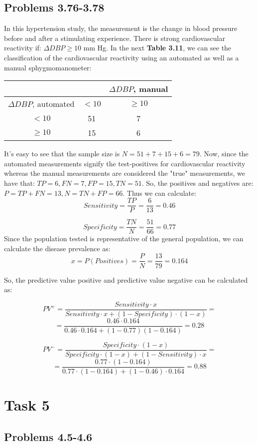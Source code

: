 \documentclass[12pt,a4paper]{article}
\begin{document}
\subsection*{Problems 3.76-3.78}
In this hypertension study, the measurement is the change in blood pressure before and after a stimulating experience. There is strong cardiovascular reactivity if: $\Delta DBP\geq 10$ mm Hg. In the next \textbf{Table 3.11}, we can see the classification of the cardiovascular reactivity using an automated as well as a manual sphygmomanometer:
\begin{center}
\begin{tabular}{ c c c }
 & & $\Delta DBP$, manual \\ \hline
 $\Delta DBP$, automated & $< 10$ & $\geq 10$ \\ \hline  
 $< 10$ & 51 & 7 \\
 $\geq 10$ & 15 & 6 
\end{tabular}
\end{center}

It's easy to see that the sample size is $N=51+7+15+6=79$. Now, since the automated measurements signify the test-positives for cardiovascular reactivity whereas the manual measurements are considered the "true" measurements, we have that: $TP=6, FN=7, FP=15, TN =51$. So, the positives and negatives are: $P=TP+FN=13, N=TN+FP=66$. Thus we can calculate:
$$Sensitivity=\frac{TP}{P}=\frac{6}{13}=0.46$$

$$Specificity=\frac{TN}{N}=\frac{51}{66}=0.77$$
Since the population tested is representative of the general population, we can calculate the disease prevalence as:
$$x=P(Positives)=\frac{P}{N}=\frac{13}{79}=0.164$$

So, the predictive value positive and predictive value negative can be calculated as:

$$PV^+=\frac{Sensitivity\cdot x}{Sensitivity\cdot x + (1-Specificity)\cdot (1-x)}=$$
$$=\frac{0.46\cdot 0.164}{0.46\cdot 0.164 + (1-0.77)(1-0.164)}=0.28$$

$$PV^-=\frac{Specificity\cdot (1-x)}{Specificity\cdot (1-x) + (1-Sensitivity)\cdot x}=$$
$$=\frac{0.77\cdot (1-0.164)}{0.77\cdot (1-0.164) + (1-0.46)\cdot0.164}=0.88$$

\section*{Task 5}

\subsection*{Problems 4.5-4.6}
\end{document}
